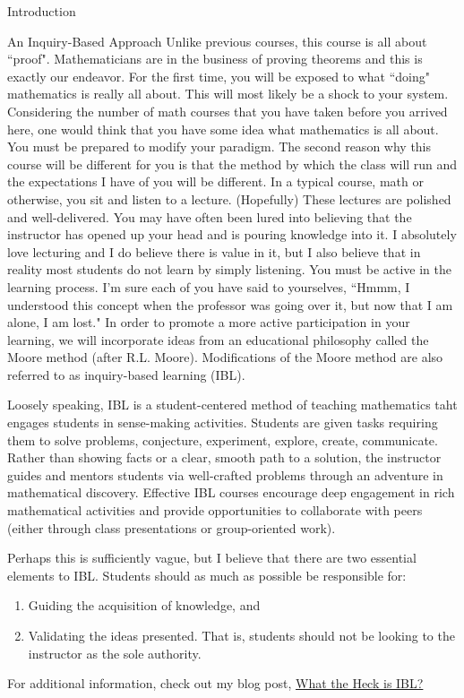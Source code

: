 \begin{chapter}{Introduction}
\begin{section}{An Inquiry-Based Approach}
Unlike previous courses, this course is all about ``proof". Mathematicians are in the business of proving theorems and this is exactly our endeavor. For the first time, you will be exposed to what ``doing" mathematics is really all about. This will most likely be a shock to your system. Considering the number of math courses that you have taken before you arrived here, one would think that you have some idea what mathematics is all about. You must be prepared to modify your paradigm. The second reason why this course will be different for you is that the method by which the class will run and the expectations I have of you will be different. In a typical course, math or otherwise, you sit and listen to a lecture. (Hopefully) These lectures are polished and well-delivered. You may have often been lured into believing that the instructor has opened up your head and is pouring knowledge into it. I absolutely love lecturing and I do believe there is value in it, but I also believe that in reality most students do not learn by simply listening. You must be active in the learning process. I'm sure each of you have said to yourselves, ``Hmmm, I understood this concept when the professor was going over it, but now that I am alone, I am lost." In order to promote a more active participation in your learning, we will incorporate ideas from an educational philosophy called the Moore method (after R.L. Moore). Modifications of the Moore method are also referred to as inquiry-based learning (IBL).

Loosely speaking, IBL is a student-centered method of teaching mathematics taht engages students in sense-making activities.  Students are given tasks requiring them to solve problems, conjecture, experiment, explore, create, communicate.  Rather than showing facts or a clear, smooth path to a solution, the instructor guides and mentors students via well-crafted problems through an adventure in mathematical discovery.  Effective IBL courses encourage deep engagement in rich mathematical activities and provide opportunities to collaborate with peers (either through class presentations or group-oriented work).

Perhaps this is sufficiently vague, but I believe that there are two essential elements to IBL.  Students should as much as possible be responsible for:
\begin{enumerate}
\item Guiding the acquisition of knowledge, and
\item Validating the ideas presented.  That is, students should not be looking to the instructor as the sole authority.
\end{enumerate}
\noindent For additional information, check out my blog post, \href{http://maamathedmatters.blogspot.com/2013/05/what-heck-is-ibl.html}{What the Heck is IBL?}


\end{section}
\end{chapter}
